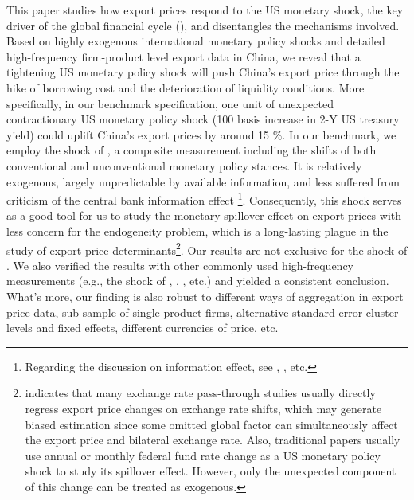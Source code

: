 This paper studies how export prices respond to the US monetary shock, the key driver of the global financial cycle (\cite{miranda2020us}), and disentangles the mechanisms involved. Based on highly exogenous international monetary policy shocks and detailed high-frequency firm-product level export data in China, we reveal that a tightening US monetary policy shock will push China's export price through the hike of borrowing cost and the deterioration of liquidity conditions. More specifically, in our benchmark specification, one unit of unexpected contractionary US monetary policy shock (100 basis increase in 2-Y US treasury yield) could uplift China's export prices by around 15 $\%$. In our benchmark, we employ the shock of \cite{bu2021unified}, a composite measurement including the shifts of both conventional and unconventional monetary policy stances. It is relatively exogenous, largely unpredictable by available information, and less suffered from criticism of the central bank information effect \footnote{Regarding the discussion on information effect, see \cite{nakamura2018high}, \cite{jarocinski2020deconstructing}, etc.}. Consequently, this shock serves as a good tool for us to study the monetary spillover effect on export prices with less concern for the endogeneity problem, which is a long-lasting plague in the study of export price determinants\footnote{\cite{zhang2022monetary} indicates that many exchange rate pass-through studies usually directly regress export price changes on exchange rate shifts, which may generate biased estimation since some omitted global factor can simultaneously affect the export price and bilateral exchange rate. Also, traditional papers usually use annual or monthly federal fund rate change as a US monetary policy shock to study its spillover effect. However, only the unexpected component of this change can be treated as exogenous.}. Our results are not exclusive for the shock of \cite{bu2021unified}. We also verified the results with other commonly used high-frequency measurements (e.g., the shock of \cite{guraynak2005actions}, \cite{nakamura2018high}, \cite{jarocinski2020deconstructing}, etc.) and yielded a consistent conclusion. What's more, our finding is also robust to different ways of aggregation in export price data, sub-sample of single-product firms, alternative standard error cluster levels and fixed effects, different currencies of price, etc. 

